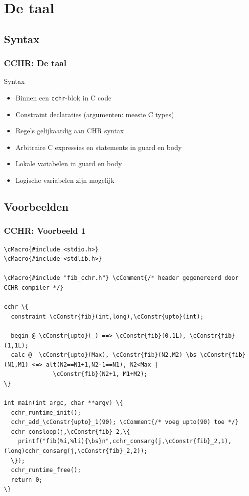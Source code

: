 \documentclass{beamer}
\newcommand{\bs}{$\backslash$}
\newcommand{\cConstr}[1]{\textcolor{blue}{#1}}
\newcommand{\cMacro}[1]{\textcolor{dred}{#1}}
\newcommand{\cComment}[1]{\textcolor{dgreen}{#1}}
\newcommand{\code}[1]{{\tt #1}}
\begin{document}
\section{De taal}

\subsection{Syntax}

\begin{frame}
  \frametitle{CCHR: De taal}
  \begin{block}{Syntax}
    \begin{itemize}
      \item Binnen een \code{cchr}-blok in C code
      \item Constraint declaraties (argumenten: meeste C types)
      \item Regels gelijkaardig aan CHR syntax
      \item Arbitraire C expressies en statements in guard en body
      \item Lokale variabelen in guard en body
      \item Logische variabelen zijn mogelijk
    \end{itemize}
  \end{block}
\end{frame}

\subsection{Voorbeelden}

\begin{frame}[containsverbatim]
  \frametitle{CCHR: Voorbeeld 1}
  \begin{example}[Voorbeeld 1]{\tiny
\begin{Verbatim}[commandchars=\\\{\}]
\cMacro{#include <stdio.h>}
\cMacro{#include <stdlib.h>}

\cMacro{#include "fib_cchr.h"} \cComment{/* header gegenereerd door CCHR compiler */}

cchr \{
  constraint \cConstr{fib}(int,long),\cConstr{upto}(int);

  begin @ \cConstr{upto}(_) ==> \cConstr{fib}(0,1L), \cConstr{fib}(1,1L);
  calc @  \cConstr{upto}(Max), \cConstr{fib}(N2,M2) \bs \cConstr{fib}(N1,M1) <=> alt(N2==N1+1,N2-1==N1), N2<Max |
              \cConstr{fib}(N2+1, M1+M2);
\}

int main(int argc, char **argv) \{
  cchr_runtime_init();
  cchr_add_\cConstr{upto}_1(90); \cComment{/* voeg upto(90) toe */}
  cchr_consloop(j,\cConstr{fib}_2,\{
    printf("fib(%i,%li){\bs}n",cchr_consarg(j,\cConstr{fib}_2,1),(long)cchr_consarg(j,\cConstr{fib}_2,2));
  \});
  cchr_runtime_free();
  return 0;
\}
\end{Verbatim}
}  \end{example}
\end{frame}
\end{document}
